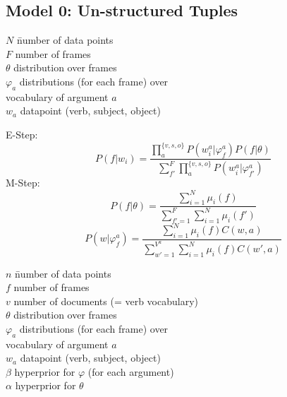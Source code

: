 \documentclass[10pt,twocolumn]{scrartcl}
\renewcommand\phi\varphi
\begin{document}
\subsection{Model 0: Un-structured Tuples}
\begin{tabbing}
    $N$ \hspace{10pt}\= number of data points\\
    $F$              \> number of frames\\
    $\theta$         \> distribution over frames\\
    $\varphi_a$      \> distributions (for each frame) over \\ 
                     \> vocabulary of argument $a$\\
    $w_a$            \> datapoint (verb, subject, object)\\
\end{tabbing}
E-Step:
\begin{equation}
P(f|w_i) = \frac{\prod_a^{\{v,s,o\}}P(w_i^a|\phi_f^a) P(f|\theta)}{\sum_{f'}^F\prod_a^{\{v,s,o\}}P(w_i^a|\phi_{f'}^a)}
\end{equation}
M-Step:
\begin{equation}
P(f|\theta) = \frac{\sum_{i=1}^N \mu_i(f)}{\sum_{f'=1}^F\sum_{i=1}^N\mu_i(f')}
\end{equation}
\begin{equation}
P(w|\phi_f^a) = \frac{\sum_{i=1}^N \mu_i(f) C(w,a)}{\sum_{w'=1}^{V^a}\sum_{i=1}^N \mu_i(f) C(w',a)}
\end{equation}
\begin{tabbing}
    $n$ \hspace{10pt}\= number of data points\\
    $f$              \> number of frames\\
    $v$              \> number of documents (= verb vocabulary)\\
    $\theta$         \> distribution over frames\\
    $\varphi_a$      \> distributions (for each frame) over \\ 
                     \> vocabulary of argument $a$\\
    $w_a$            \> datapoint (verb, subject, object)\\
    $\beta$          \> hyperprior for $\varphi$ (for each argument)\\
    $\alpha$         \> hyperprior for $\theta$ \\
\end{tabbing}
\end{document}
